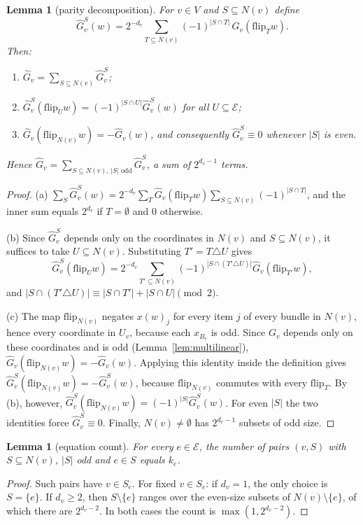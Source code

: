 \documentclass[11pt,letterpaper]{article}
\newtheorem{lemma}[theorem]{Lemma}
\theoremstyle{definition}
\newcommand{\cE}{\mathcal{E}}
\newcommand{\flip}{\mathrm{flip}}
\newcommand{\hG}{\widehat{G}}
\begin{document}
\begin{lemma}[parity decomposition]\label{lem:parity}
For $v\in V$ and $S\subseteq N(v)$ define
\[
  \hG_v^S(w)=2^{-d_v}\sum_{T\subseteq N(v)}(-1)^{|S\cap T|}\,\hG_v(\flip_Tw).
\]
Then:
\begin{enumerate}[label=(\alph*),itemsep=0pt]
\item $\hG_v=\sum_{S\subseteq N(v)}\hG_v^S$;
\item $\hG_v^S(\flip_Uw)=(-1)^{|S\cap U|}\hG_v^S(w)$ for all $U\subseteq\cE$;
\item $\hG_v(\flip_{N(v)}w)=-\hG_v(w)$, and consequently $\hG_v^S\equiv0$ whenever $|S|$ is even.
\end{enumerate}
Hence $\hG_v=\sum_{S\subseteq N(v),\,|S|\text{ odd}}\hG_v^S$, a sum of $2^{d_v-1}$ terms.
\end{lemma}

\begin{proof}
(a) $\sum_S\hG_v^S(w)=2^{-d_v}\sum_T\hG_v(\flip_Tw)\sum_{S\subseteq N(v)}(-1)^{|S\cap T|}$, and the
inner sum equals $2^{d_v}$ if $T=\emptyset$ and $0$ otherwise.

(b) Since $\hG_v^S$ depends only on the coordinates in $N(v)$ and $S\subseteq N(v)$, it suffices
to take $U\subseteq N(v)$. Substituting $T'=T\triangle U$ gives
\[
  \hG_v^S(\flip_Uw)=2^{-d_v}\sum_{T'\subseteq N(v)}(-1)^{|S\cap(T'\triangle U)|}\hG_v(\flip_{T'}w),
\]
and $|S\cap(T'\triangle U)|\equiv|S\cap T'|+|S\cap U|\pmod 2$.

(c) The map $\flip_{N(v)}$ negates $x(w)_j$ for every item $j$ of every bundle in $N(v)$, hence
every coordinate in $U_v$, because each $x_{B_e}$ is odd. Since $G_v$ depends only on these
coordinates and is odd (Lemma~\ref{lem:multilinear}), $\hG_v(\flip_{N(v)}w)=-\hG_v(w)$. Applying
this identity inside the definition gives $\hG_v^S(\flip_{N(v)}w)=-\hG_v^S(w)$, because
$\flip_{N(v)}$ commutes with every $\flip_T$. By (b), however,
$\hG_v^S(\flip_{N(v)}w)=(-1)^{|S|}\hG_v^S(w)$. For even $|S|$ the two identities force
$\hG_v^S\equiv0$. Finally, $N(v)\ne\emptyset$ has $2^{d_v-1}$ subsets of odd size.
\end{proof}

\begin{lemma}[equation count]\label{lem:count}
For every $e\in\cE$, the number of pairs $(v,S)$ with $S\subseteq N(v)$, $|S|$ odd and $e\in S$
equals $k_e$.
\end{lemma}

\begin{proof}
Such pairs have $v\in S_e$. For fixed $v\in S_e$: if $d_v=1$, the only choice is $S=\{e\}$. If
$d_v\ge2$, then $S\setminus\{e\}$ ranges over the even-size subsets of $N(v)\setminus\{e\}$, of
which there are $2^{d_v-2}$. In both cases the count is $\max(1,2^{d_v-2})$.
\end{proof}
\end{document}
